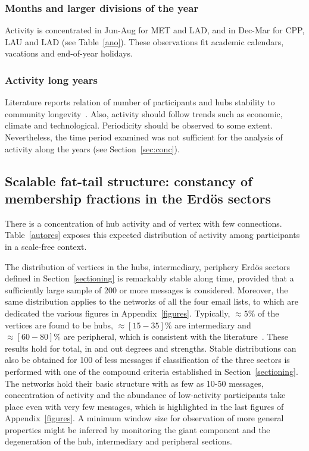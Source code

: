 \documentclass[%
 aip,
 jmp,%
 amsmath,amssymb,
 reprint,%
]{revtex4-1}
\begin{document}
\subsubsection{Months and larger divisions of the year}
 Activity is concentrated in Jun-Aug for MET and LAD, and in Dec-Mar for CPP, LAU and LAD (see Table~\ref{ano}). These observations fit academic calendars, vacations and end-of-year holidays.

\subsubsection{Activity long years}
Literature reports relation of number of participants and hubs stability to community longevity~\cite{barabasiEvo}. Also, activity should follow trends such as economic, climate and technological. Periodicity should be observed to some extent. Nevertheless, the time period examined was not sufficient for the analysis of activity along the years (see Section~\ref{sec:conc}). 

\subsection{Scalable fat-tail structure: constancy of membership fractions in the Erd\"os sectors}\label{subsec:pih}


There is a concentration of hub activity and of vertex with few connections. Table~\ref{autores} exposes this expected distribution of activity among participants in a scale-free context.

The distribution of vertices in the  hubs, intermediary, periphery Erd\"os sectors defined in Section~\ref{sectioning} is remarkably stable along time, provided that a sufficiently large sample of 200 or more messages is considered. 
Moreover, the same distribution applies to the networks of all the four email lists, to which are dedicated the various figures in Appendix~\ref{figures}. 
Typically, $\approx 5\%$ of the vertices are found to be hubs, $\approx [15-35]\%$ are intermediary and $\approx [60-80]\%$ are peripheral, which is consistent with the literature~\cite{secFree}.
These results hold for total, in and out degrees and strengths.
Stable distributions can also be obtained for 100 of less messages if classification of the three sectors is performed with one of the compound criteria established in Section~\ref{sectioning}. 
The networks hold their basic structure with as few as 10-50 messages, concentration of activity and the abundance of low-activity participants take place even with very few messages, which is highlighted in the last figures of Appendix~\ref{figures}.
A minimum window size for observation of more general properties might be inferred by monitoring the giant component and the degeneration of the hub, intermediary and peripheral sections.
\end{document}
